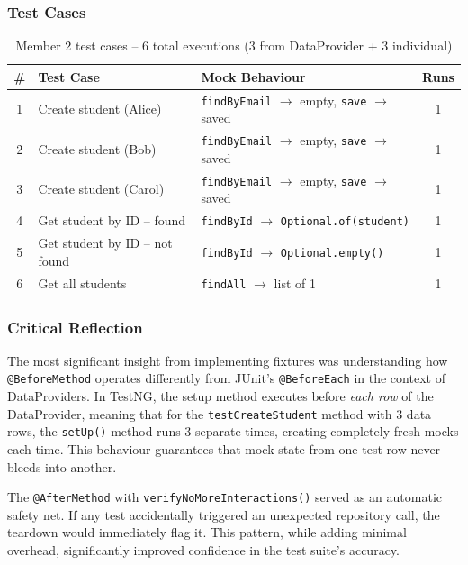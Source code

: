 \documentclass[12pt,a4paper]{article}
\begin{document}
\subsubsection{Test Cases}

\begin{table}[H]
\centering
\begin{tabular}{cllc}
    \toprule
    \textbf{\#} & \textbf{Test Case} & \textbf{Mock Behaviour} & \textbf{Runs} \\
    \midrule
    1 & Create student (Alice) & \texttt{findByEmail} $\rightarrow$ empty, \texttt{save} $\rightarrow$ saved & 1 \\
    2 & Create student (Bob) & \texttt{findByEmail} $\rightarrow$ empty, \texttt{save} $\rightarrow$ saved & 1 \\
    3 & Create student (Carol) & \texttt{findByEmail} $\rightarrow$ empty, \texttt{save} $\rightarrow$ saved & 1 \\
    4 & Get student by ID -- found & \texttt{findById} $\rightarrow$ \texttt{Optional.of(student)} & 1 \\
    5 & Get student by ID -- not found & \texttt{findById} $\rightarrow$ \texttt{Optional.empty()} & 1 \\
    6 & Get all students & \texttt{findAll} $\rightarrow$ list of 1 & 1 \\
    \bottomrule
\end{tabular}
\caption{Member 2 test cases -- 6 total executions (3 from DataProvider + 3 individual)}
\end{table}

\subsubsection{Critical Reflection}

The most significant insight from implementing fixtures was understanding how \texttt{@BeforeMethod} operates differently from JUnit's \texttt{@BeforeEach} in the context of DataProviders. In TestNG, the setup method executes before \textit{each row} of the DataProvider, meaning that for the \texttt{testCreateStudent} method with 3 data rows, the \texttt{setUp()} method runs 3 separate times, creating completely fresh mocks each time. This behaviour guarantees that mock state from one test row never bleeds into another.

The \texttt{@AfterMethod} with \texttt{verifyNoMoreInteractions()} served as an automatic safety net. If any test accidentally triggered an unexpected repository call, the teardown would immediately flag it. This pattern, while adding minimal overhead, significantly improved confidence in the test suite's accuracy.
\end{document}
